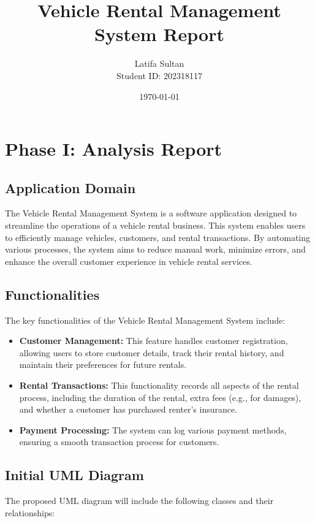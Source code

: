 \documentclass{article}
\title{Vehicle Rental Management System Report}
\author{\fontsize{18}{16}\selectfont Latifa Sultan \\[0.5em] \fontsize{12}{14}\selectfont Student ID: 202318117}
\date{\today}
\begin{document}
\maketitle

\section{Phase I: Analysis Report}
\subsection{Application Domain}
The Vehicle Rental Management System is a software application designed to streamline the operations of a vehicle rental business. This system enables users to efficiently manage vehicles, customers, and rental transactions. By automating various processes, the system aims to reduce manual work, minimize errors, and enhance the overall customer experience in vehicle rental services.

\subsection{Functionalities}
The key functionalities of the Vehicle Rental Management System include:

\begin{itemize}
    \item \textbf{Customer Management:} 
    This feature handles customer registration, allowing users to store customer details, track their rental history, and maintain their preferences for future rentals.
    
    \item \textbf{Rental Transactions:} 
    This functionality records all aspects of the rental process, including the duration of the rental, extra fees (e.g., for damages), and whether a customer has purchased renter's insurance.
    
    \item \textbf{Payment Processing:} 
    The system can log various payment methods, ensuring a smooth transaction process for customers.
\end{itemize}

\subsection{Initial UML Diagram}
The proposed UML diagram will include the following classes and their relationships:
\end{document}
